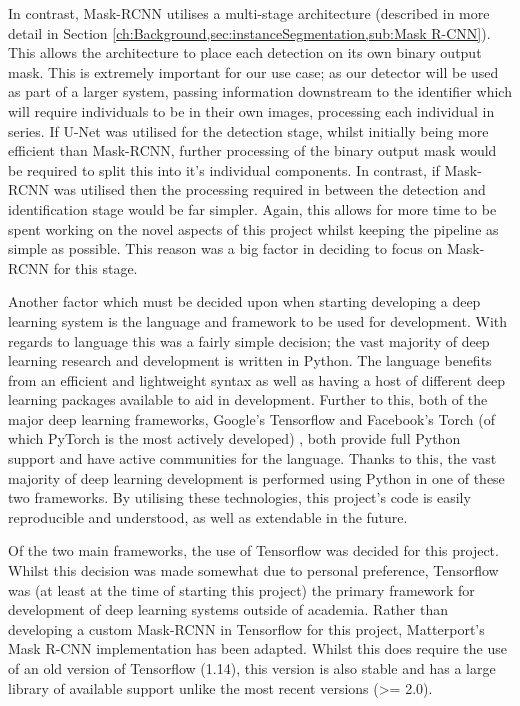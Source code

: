 In contrast, Mask-RCNN utilises a multi-stage architecture (described in more detail in Section \ref{ch:Background,sec:instanceSegmentation,sub:Mask R-CNN}). This allows the architecture to place each detection on its own binary output mask. This is extremely important for our use case; as our detector will be used as part of a larger system, passing information downstream to the identifier which will require individuals to be in their own images, processing each individual in series. If U-Net was utilised for the detection stage, whilst initially being more efficient than Mask-RCNN, further processing of the binary output mask would be required to split this into it's individual components. In contrast, if Mask-RCNN was utilised then the processing required in between the detection and identification stage would be far simpler. Again, this allows for more time to be spent working on the novel aspects of this project whilst keeping the pipeline as simple as possible. This reason was a big factor in deciding to focus on Mask-RCNN for this stage.

Another factor which must be decided upon when starting developing a deep learning system is the language and framework to be used for development. With regards to language this was a fairly simple decision; the vast majority of deep learning research and development is written in Python. The language benefits from an efficient and lightweight syntax as well as having a host of different deep learning packages available to aid in development. Further to this, both of the major deep learning frameworks, Google's Tensorflow \cite{abadi_tensorflow:_2016} and Facebook's Torch (of which PyTorch is the most actively developed) \cite{paszke_automatic_2017}, both provide full Python support and have active communities for the language. Thanks to this, the vast majority of deep learning development is performed using Python in one of these two frameworks. By utilising these technologies, this project's code is easily reproducible and understood, as well as extendable in the future.

Of the two main frameworks, the use of Tensorflow was decided for this project. Whilst this decision was made somewhat due to personal preference, Tensorflow was (at least at the time of starting this project) the primary framework for development of deep learning systems outside of academia. Rather than developing a custom Mask-RCNN in Tensorflow for this project, Matterport's Mask R-CNN implementation \cite{waleed_mask_2017} has been adapted. Whilst this does require the use of an old version of Tensorflow (1.14), this version is also stable and has a large library of available support unlike the most recent versions (>= 2.0).

